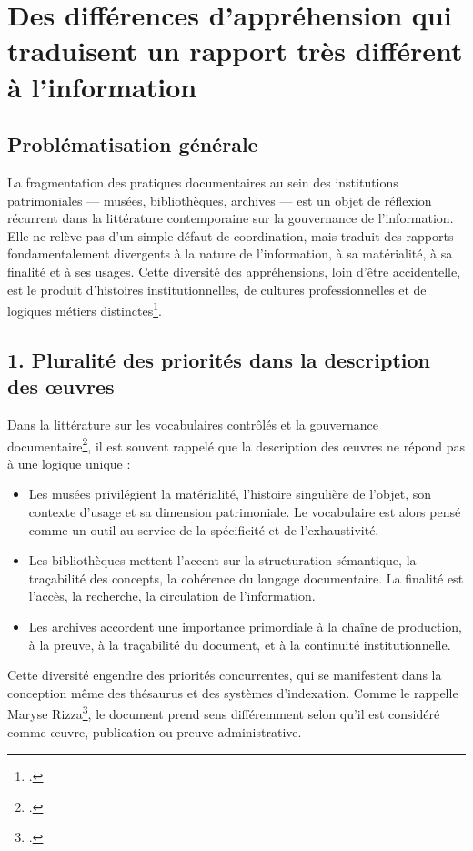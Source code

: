 \section{\label{II-B-2}Des différences d’appréhension qui traduisent un rapport très différent à l’information}

\subsection*{Problématisation générale}

La fragmentation des pratiques documentaires au sein des institutions patrimoniales — musées, bibliothèques, archives — est un objet de réflexion récurrent dans la littérature contemporaine sur la gouvernance de l'information. Elle ne relève pas d’un simple défaut de coordination, mais traduit des rapports fondamentalement divergents à la nature de l’information, à sa matérialité, à sa finalité et à ses usages. Cette diversité des appréhensions, loin d’être accidentelle, est le produit d’histoires institutionnelles, de cultures professionnelles et de logiques métiers distinctes\footcite{bowkerArrangerChosesConsequences2023,gartnerArchivesMuseumsLibraries2019,rizzaDocumentAuCoeur2014}.

\subsection*{1. Pluralité des priorités dans la description des œuvres}

Dans la littérature sur les vocabulaires contrôlés et la gouvernance documentaire\footcite{hudonISO25964Pour2012a,nouvelOutilsDindexationBibliothecaires2022,chichereauNormesConceptionGestion2007}, il est souvent rappelé que la description des œuvres ne répond pas à une logique unique :
\begin{itemize}
	\item Les musées privilégient la matérialité, l’histoire singulière de l’objet, son contexte d’usage et sa dimension patrimoniale. Le vocabulaire est alors pensé comme un outil au service de la spécificité et de l’exhaustivité.
	\item Les bibliothèques mettent l’accent sur la structuration sémantique, la traçabilité des concepts, la cohérence du langage documentaire. La finalité est l’accès, la recherche, la circulation de l’information.
	\item Les archives accordent une importance primordiale à la chaîne de production, à la preuve, à la traçabilité du document, et à la continuité institutionnelle.
\end{itemize}
Cette diversité engendre des priorités concurrentes, qui se manifestent dans la conception même des thésaurus et des systèmes d’indexation. Comme le rappelle Maryse Rizza\footcite{rizzaDocumentAuCoeur2014}, le document prend sens différemment selon qu’il est considéré comme œuvre, publication ou preuve administrative.

